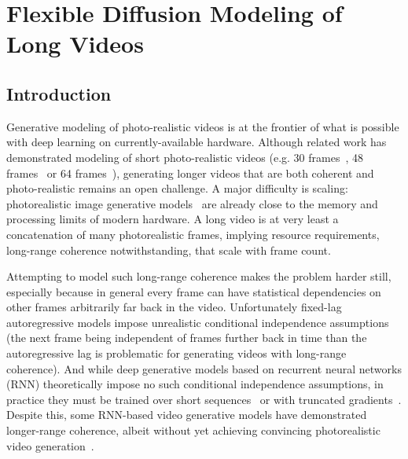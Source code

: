\chapter{Flexible Diffusion Modeling of Long Videos}
\label{ch:fdm}


\section{Introduction}\label{sec:intro}

Generative modeling of photo-realistic videos is at the frontier of what is possible with deep learning on currently-available hardware. Although related work has demonstrated modeling of short photo-realistic videos (e.g. 30 frames~\citep{weissenborn2019scaling}, 48 frames~\cite{clark2019adversarial} or 64 frames~\citep{ho2022video}), generating longer videos that are both coherent and photo-realistic remains an open challenge. A major difficulty is scaling: photorealistic image generative models~\citep{child2020very,dhariwal2021diffusion} are already close to the memory and processing limits of modern hardware.  A long video is at very least a concatenation of many photorealistic frames, implying resource requirements, long-range coherence notwithstanding, that scale with frame count. 

Attempting to model such long-range coherence makes the problem harder still, especially because in general every frame can have statistical dependencies on other frames arbitrarily far back in the video.
%
%
Unfortunately fixed-lag autoregressive models impose unrealistic conditional independence assumptions (the next frame being independent of frames further back in time than the autoregressive lag is problematic for generating videos with long-range coherence).  And while deep generative models based on recurrent neural networks (RNN) theoretically impose no such conditional independence assumptions, in practice they must be trained over short sequences~\cite{gruslys2016memory,saxena2021clockwork} or with truncated gradients~\citep{tallec2017unbiasing}.  Despite this, some RNN-based video generative models have demonstrated longer-range coherence, albeit without yet achieving convincing photorealistic video generation~\citep{saxena2021clockwork,babaeizadeh2021fitvid,denton2018stochastic,kim2019variational,babaeizadeh2017stochastic}.

